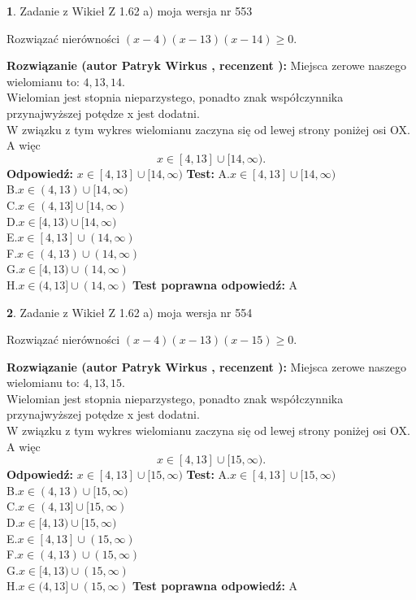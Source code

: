 \documentclass[12pt, a4paper]{article}
\theoremstyle{definition} %
\newtheorem{zad}{}
\newcommand{\zadStart}[1]{\begin{zad}#1\newline}
\newcommand{\zadStop}{\end{zad}}
\newcommand{\rozwStart}[2]{\noindent \textbf{Rozwiązanie (autor #1 , recenzent #2): }\newline}
\newcommand{\rozwStop}{\newline}
\newcommand{\odpStart}{\noindent \textbf{Odpowiedź:}\newline}
\newcommand{\odpStop}{\newline}
\newcommand{\testStart}{\noindent \textbf{Test:}\newline}
\newcommand{\testStop}{\newline}
\newcommand{\kluczStart}{\noindent \textbf{Test poprawna odpowiedź:}\newline}
\newcommand{\kluczStop}{\newline}
\begin{document}
\zadStart{Zadanie z Wikieł Z 1.62 a) moja wersja nr 553}

Rozwiązać nierówności $(x-4)(x-13)(x-14)\ge0$.
\zadStop
\rozwStart{Patryk Wirkus}{}
Miejsca zerowe naszego wielomianu to: $4, 13, 14$.\\
Wielomian jest stopnia nieparzystego, ponadto znak współczynnika przy\linebreak najwyższej potędze x jest dodatni.\\ W związku z tym wykres wielomianu zaczyna się od lewej strony poniżej osi OX. A więc $$x \in [4,13] \cup [14,\infty).$$
\rozwStop
\odpStart
$x \in [4,13] \cup [14,\infty)$
\odpStop
\testStart
A.$x \in [4,13] \cup [14,\infty)$\\
B.$x \in (4,13) \cup [14,\infty)$\\
C.$x \in (4,13] \cup [14,\infty)$\\
D.$x \in [4,13) \cup [14,\infty)$\\
E.$x \in [4,13] \cup (14,\infty)$\\
F.$x \in (4,13) \cup (14,\infty)$\\
G.$x \in [4,13) \cup (14,\infty)$\\
H.$x \in (4,13] \cup (14,\infty)$
\testStop
\kluczStart
A
\kluczStop



\zadStart{Zadanie z Wikieł Z 1.62 a) moja wersja nr 554}

Rozwiązać nierówności $(x-4)(x-13)(x-15)\ge0$.
\zadStop
\rozwStart{Patryk Wirkus}{}
Miejsca zerowe naszego wielomianu to: $4, 13, 15$.\\
Wielomian jest stopnia nieparzystego, ponadto znak współczynnika przy\linebreak najwyższej potędze x jest dodatni.\\ W związku z tym wykres wielomianu zaczyna się od lewej strony poniżej osi OX. A więc $$x \in [4,13] \cup [15,\infty).$$
\rozwStop
\odpStart
$x \in [4,13] \cup [15,\infty)$
\odpStop
\testStart
A.$x \in [4,13] \cup [15,\infty)$\\
B.$x \in (4,13) \cup [15,\infty)$\\
C.$x \in (4,13] \cup [15,\infty)$\\
D.$x \in [4,13) \cup [15,\infty)$\\
E.$x \in [4,13] \cup (15,\infty)$\\
F.$x \in (4,13) \cup (15,\infty)$\\
G.$x \in [4,13) \cup (15,\infty)$\\
H.$x \in (4,13] \cup (15,\infty)$
\testStop
\kluczStart
A
\kluczStop
\end{document}
